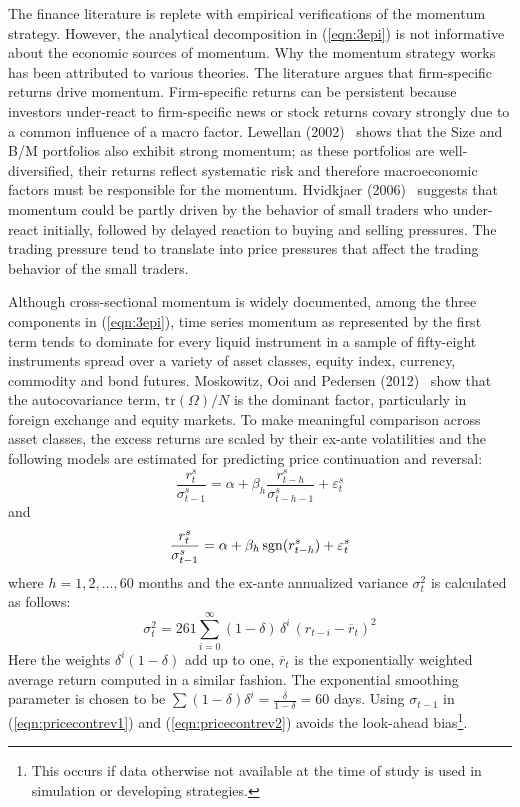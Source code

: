 The finance literature is replete with empirical verifications of the momentum strategy. However, the analytical decomposition in (\ref{eqn:3epi}) is not informative about the economic sources of momentum. Why the momentum strategy works has been attributed to various theories. The literature argues that firm-specific returns drive momentum. Firm-specific returns can be persistent because investors under-react to firm-specific news or stock returns covary strongly due to a common influence of a macro factor. Lewellan (2002)~\cite{lew2002} shows that the Size and B/M portfolios also exhibit strong momentum; as these portfolios are well-diversified, their returns reflect systematic risk and therefore macroeconomic factors must be responsible for the momentum. Hvidkjaer (2006)~\cite{hvid2006} suggests that momentum could be partly driven by the behavior of small traders who under-react initially, followed by delayed reaction to buying and selling pressures. The trading pressure tend to translate into price pressures that affect the trading behavior of the small traders.


Although cross-sectional momentum is widely documented, among the three components in (\ref{eqn:3epi}), time series momentum as represented by the first term tends to dominate for every liquid instrument in a sample of fifty-eight instruments spread over a variety of asset classes, equity index, currency, commodity and bond futures. Moskowitz, Ooi and Pedersen (2012)~\cite{mos2012} show that the autocovariance term, $\text{tr}(\Omega)/N$ is the dominant factor, particularly in foreign exchange and equity markets. To make meaningful comparison across asset classes, the excess returns are scaled by their ex-ante volatilities and the following models are estimated for predicting price continuation and reversal:
	\begin{equation}\label{eqn:pricecontrev1}
	\frac{r_t^s}{\sigma_{t-1}^s} = \alpha + \beta_h \dfrac{r_{t-h}^s}{\sigma_{t-h-1}^s} + \varepsilon_t^s
	\end{equation}
and
	\begin{equation}\label{eqn:pricecontrev2}
	\frac{r_t^s}{\sigma_{t-1}^s} = \alpha + \beta_h \sgn(r_{t-h}^s) + \varepsilon_t^s
	\end{equation}
where $h= 1,2,\ldots,60$ months and the ex-ante annualized variance $\sigma_t^2$ is calculated as follows:
	\begin{equation}\label{eqn:pricecontrev3}
	\sigma_t^2 = 261 \sum_{i=0}^\infty (1-\delta)\,\delta^i \,(r_{t-i} - \overline{r}_t)^2
	\end{equation}
Here the weights $\delta^i (1 - \delta)$ add up to one, $\overline{r}_t$ is the exponentially weighted average return computed in a similar fashion. The exponential smoothing parameter is chosen to be $\sum(1-\delta)\delta^i = \frac{\delta}{1-\delta} = 60$ days. Using $\sigma_{t-1}$ in (\ref{eqn:pricecontrev1}) and (\ref{eqn:pricecontrev2}) avoids the look-ahead bias\footnote{This occurs if data otherwise not available at the time of study is used in simulation or developing strategies.}.


